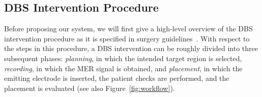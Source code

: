 \documentclass[review]{vgtc}                 %
\begin{document}
\subsection{DBS Intervention Procedure}\label{sec:overview:procedure}
Before proposing our system, we will first give a high-level overview of the DBS intervention procedure as it is specified in surgery guidelines~\cite{Hemm2010}. With respect to the steps in this procedure, a DBS intervention can be roughly divided into three subsequent phases: \emph{planning}, in which the intended target region is selected, \emph{recording}, in which the MER signal is obtained, and \emph{placement}, in which the emitting electrode is inserted, the patient checks are performed, and the placement is evaluated (see also Figure~\ref{fig:workflow}). %
%
%
%
\end{document}
